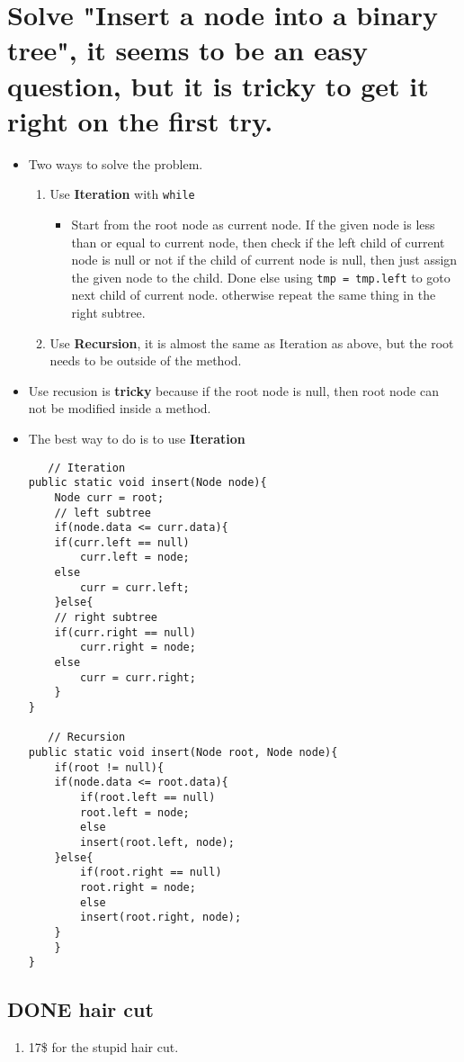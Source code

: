 \documentclass[11pt]{article}
\begin{document}
\section{Solve "Insert a node into a binary tree", it seems to be an easy question, but it is tricky to get it right on the first try.}
\label{sec:org7cb1fd7}
\begin{itemize}
\item Two ways to solve the problem.
\begin{enumerate}
\item Use \textbf{Iteration} with \texttt{while}
\begin{itemize}
\item Start from the root node as current node.
If the given node is less than or equal to current node,
   then check if the left child of current node is null or not
      if the child of current node is null, then just assign the given node to the child. Done
      else using \texttt{tmp = tmp.left} to goto next child of current node.
otherwise repeat the same thing in the right subtree.
\end{itemize}
\item Use \textbf{Recursion}, it is almost the same as Iteration as above, but the root needs to be outside of the method.
\end{enumerate}
\item Use recusion is \textbf{tricky} because if the root node is null, then root node can not be modified inside a method.
\item The best way to do is to use \textbf{Iteration}
\begin{verbatim}
   // Iteration
public static void insert(Node node){
    Node curr = root;
    // left subtree
    if(node.data <= curr.data){
	if(curr.left == null)
	    curr.left = node;
	else
	    curr = curr.left;
    }else{
	// right subtree
	if(curr.right == null)
	    curr.right = node;
	else
	    curr = curr.right;
    }
}

   // Recursion
public static void insert(Node root, Node node){
    if(root != null){
	if(node.data <= root.data){
	    if(root.left == null)
		root.left = node;
	    else
		insert(root.left, node);
	}else{
	    if(root.right == null)
		root.right = node;
	    else
		insert(root.right, node);
	}
    }
}
\end{verbatim}
\end{itemize}

\subsection{{\bfseries\sffamily DONE} hair cut}
\label{sec:orgbdb5a83}
\begin{enumerate}
\item 17\$ for the stupid hair cut.
\end{enumerate}
\end{document}
